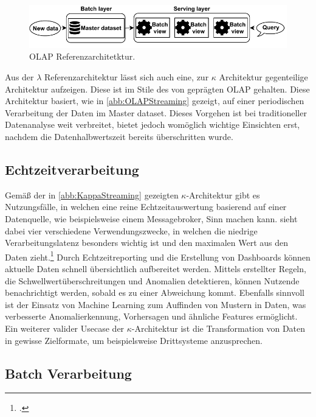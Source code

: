 \begin{figure}[H]
\centering
\includegraphics[width=\textwidth]{graphics/OLAP-Reference-Architecture.pdf}
\caption[OLAP Referenzarchitetktur]{OLAP Referenzarchitetktur.\footnotemark}
\label{abb:OLAPStreaming}
\end{figure}

Aus der $\lambda$ Referenzarchitektur lässt sich auch eine, zur $\kappa$ Architektur gegenteilige Architektur aufzeigen. Diese ist im Stile des von \citeauthor{Codd.1993} geprägten \ac{OLAP} gehalten. Diese Architektur basiert, wie in \autoref{abb:OLAPStreaming} gezeigt, auf einer periodischen Verarbeitung der Daten im Master dataset. Dieses Vorgehen ist bei traditioneller Datenanalyse weit verbreitet, bietet jedoch womöglich wichtige Einsichten erst, nachdem die Datenhalbwertszeit bereits überschritten wurde.


\subsection{Echtzeitverarbeitung}
Gemäß der in \autoref{abb:KappaStreaming} gezeigten $\kappa$-Architektur gibt es Nutzungsfälle, in welchen eine reine Echtzeitauswertung basierend auf einer Datenquelle, wie beispielsweise einem Messagebroker, Sinn machen kann. \citeauthor{Belur.2020} sieht dabei vier verschiedene Verwendungszwecke, in welchen die niedrige Verarbeitungslatenz besonders wichtig ist und den maximalen Wert aus den Daten zieht.\footcite[Vgl. auch im Folgenden][]{Belur.2020} Durch Echtzeitreporting und die Erstellung von Dashboards können aktuelle Daten schnell übersichtlich aufbereitet werden. Mittels erstellter Regeln, die Schwellwertüberschreitungen und Anomalien detektieren, können Nutzende benachrichtigt werden, sobald es zu einer Abweichung kommt. Ebenfalls sinnvoll ist der Einsatz von Machine Learning zum Auffinden von Mustern in Daten, was verbesserte Anomalierkennung, Vorhersagen und ähnliche Features ermöglicht. Ein weiterer valider Usecase der $\kappa$-Architektur ist die Transformation von Daten in gewisse Zielformate, um beispielsweise Drittsysteme anzusprechen.


\subsection{Batch Verarbeitung}

